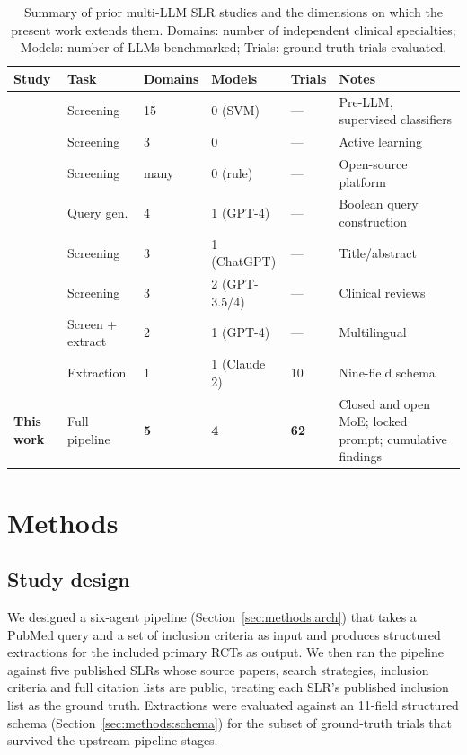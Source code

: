 \documentclass[a4paper,fleqn]{cas-sc}
\begin{document}
\begin{table}[t]
\caption{Summary of prior multi-LLM SLR studies and the dimensions on
which the present work extends them. Domains: number of independent
clinical specialties; Models: number of LLMs benchmarked; Trials:
ground-truth trials evaluated.}
\label{tbl:related}
\begin{tabular*}{\tblwidth}{@{}p{4.0cm}p{2.0cm}p{1.5cm}p{1.5cm}p{1.5cm}p{4.5cm}@{}}
\toprule
Study & Task & Domains & Models & Trials & Notes \\
\midrule
\citet{cohen2006reducing}    & Screening   & 15 & 0 (SVM) & ---  & Pre-LLM, supervised classifiers \\
\citet{wallace2010active}    & Screening   &  3 & 0       & ---  & Active learning \\
\citet{vandeschoot2021asreview} & Screening & many & 0 (rule) & --- & Open-source platform \\
\citet{wang2023llmscreen}    & Query gen.  &  4 & 1 (GPT-4) & --- & Boolean query construction \\
\citet{syriani2024screening}& Screening   &  3 & 1 (ChatGPT) & --- & Title/abstract \\
\citet{guo2024llmsr}         & Screening   &  3 & 2 (GPT-3.5/4) & --- & Clinical reviews \\
\citet{khraisha2024llmsr}    & Screen + extract & 2 & 1 (GPT-4) & --- & Multilingual \\
\citet{gartlehner2024aisr}   & Extraction  &  1 & 1 (Claude 2) & 10 & Nine-field schema \\
\textbf{This work}           & Full pipeline & \textbf{5} & \textbf{4} & \textbf{62} &
Closed and open MoE; locked prompt; cumulative findings \\
\bottomrule
\end{tabular*}
\end{table}

\section{Methods}\label{sec:methods}

\subsection{Study design}

We designed a six-agent pipeline (Section~\ref{sec:methods:arch}) that
takes a PubMed query and a set of inclusion criteria as input and produces
structured extractions for the included primary RCTs as output. We then
ran the pipeline against five published SLRs whose source papers, search
strategies, inclusion criteria and full citation lists are public,
treating each SLR's published inclusion list as the ground truth.
Extractions were evaluated against an 11-field structured schema
(Section~\ref{sec:methods:schema}) for the subset of ground-truth trials
that survived the upstream pipeline stages.
\end{document}
